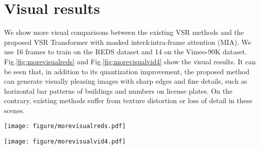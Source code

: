 \documentclass[10pt,twocolumn,letterpaper]{article}
\begin{document}
\section{Visual results}\label{d}
\label{morevisual}
We show more visual comparisons between the existing VSR methods and the proposed VSR Transformer with masked inter\&intra-frame attention (MIA). We use 16 frames to train on the REDS dataset
and 14 on the Vimeo-90K dataset. Fig.\ref{fig:morevisualreds} and Fig.\ref{fig:morevisualvid4} show the visual results. It can be seen that, in addition
to its quantization improvement, the proposed method can generate visually pleasing images with
sharp edges and fine details, such as horizontal bar patterns of buildings and numbers on license
plates. On the contrary, existing methods suffer from texture distortion or loss of detail in these scenes.
\begin{figure*}
\centering
\texttt{[image: figure/morevisualreds.pdf]}
\caption{Visual comparison for $4\times$ VSR on REDS4 dataset.}
\label{fig:morevisualreds}
\end{figure*}
\begin{figure*}
\centering
\texttt{[image: figure/morevisualvid4.pdf]}
\caption{Visual comparison for $4\times$ VSR on Vid4 dataset.}
\label{fig:morevisualvid4}
\end{figure*}
\end{document}
